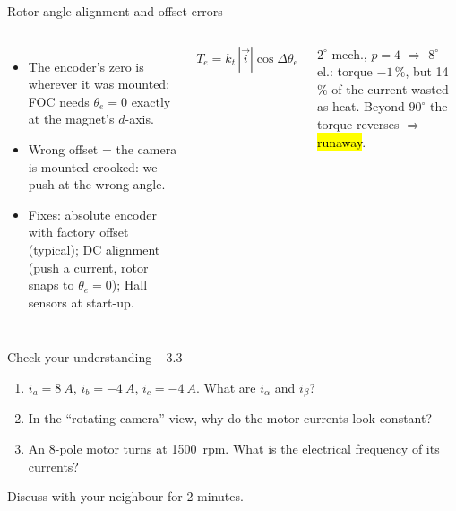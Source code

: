 \documentclass[aspectratio=169,10pt]{beamer}
\begin{document}
\begin{frame}[t]{Rotor angle alignment and offset errors}
\begin{columns}[T,onlytextwidth]
\begin{itemize}\small
\item The encoder's zero is wherever it was mounted; FOC needs $\theta_e=0$ exactly at the magnet's $d$-axis.
\item Wrong offset = the camera is mounted crooked: we push at the wrong angle.
\item Fixes: absolute encoder with factory offset (typical); DC alignment (push a current, rotor snaps to $\theta_e=0$); Hall sensors at start-up.
\end{itemize}
\begin{eqbox}\centering
$T_e=k_t\,|\vec i|\cos\Delta\theta_e$
\end{eqbox}
\begin{defbox}[Example]
\small $2^\circ$ mech., $p=4$ $\Rightarrow$ $8^\circ$ el.: torque $-1\,\%$, but 14\,\% of the current wasted as heat. Beyond $90^\circ$ the torque reverses $\Rightarrow$ \hl{runaway}.
\end{defbox}
\end{columns}
\end{frame}

\begin{frame}[t]{Check your understanding -- 3.3}
\vspace{4mm}
\begin{keybox}
\large
\begin{enumerate}
\item $i_a=\SI{8}{A}$, $i_b=\SI{-4}{A}$, $i_c=\SI{-4}{A}$. What are $i_\alpha$ and $i_\beta$?\\[3mm]
\item In the ``rotating camera'' view, why do the motor currents look constant?\\[3mm]
\item An 8-pole motor turns at \SI{1500}{rpm}. What is the electrical frequency of its currents?
\end{enumerate}
\end{keybox}
\vfill
\centering\small\color{mkGray} Discuss with your neighbour for 2 minutes.
\end{frame}
\end{document}
